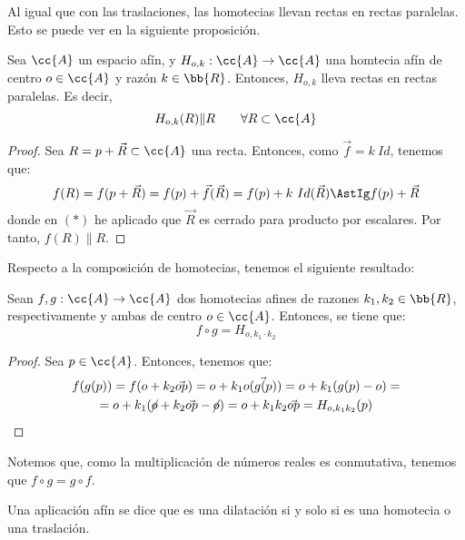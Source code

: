 Al igual que con las traslaciones, las homotecias llevan rectas en rectas paralelas. Esto se puede ver en la siguiente proposición.
\begin{prop}
    Sea $\cc{A}$ un espacio afín, y $H_{o,k}:\cc{A}\to \cc{A}$ una homtecia afín de centro $o\in \cc{A}$ y razón $k\in \bb{R}$. Entonces, $H_{o,k}$ lleva rectas en rectas paralelas. Es decir,
    \begin{equation*}
        H_{o,k}(R)\| R \qquad \forall R\subset \cc{A}
    \end{equation*}
\end{prop}
\begin{proof}
    Sea $R=p+\vec{R}\subset \cc{A}$ una recta. Entonces, como $\vec{f}=k~Id$, tenemos que:
    \begin{equation*}
        f(R) = f(p+\vec{R}) = f(p) + \vec{f}(\vec{R}) = f(p) + k~Id(\vec{R}) \AstIg f(p) + \vec{R}
    \end{equation*}
    donde en $(\ast)$ he aplicado que $\vec{R}$ es cerrado para producto por escalares. Por tanto, $f(R)\| R$.
\end{proof}

Respecto a la composición de homotecias, tenemos el siguiente resultado:
\begin{prop}
    Sean $f,g:\cc{A}\to \cc{A}$ dos homotecias afines de razones $k_1,k_2\in \bb{R}$, respectivamente y ambas de centro $o\in \cc{A}$. Entonces, se tiene que:
    \begin{equation*}
        f\circ g = H_{o,k_1\cdot k_2}
    \end{equation*}
\end{prop}
\begin{proof}
    Sea $p\in \cc{A}$. Entonces, tenemos que:
    \begin{multline*}
        f(g(p)) = f(o+k_2\vec{op}) = o+k_1\vec{o(g(p))} = o + k_1(g(p)-o) =\\= o + k_1(\cancel{o}+k_2\vec{op}-\cancel{o}) = o + k_1k_2\vec{op} = H_{o,k_1k_2}(p) \qedhere
    \end{multline*}
\end{proof}
Notemos que, como la multiplicación de números reales es conmutativa, tenemos que $f\circ g = g\circ f$.


\begin{definicion}
    Una aplicación afín se dice que es una dilatación si y solo si es una homotecia o una traslación.
\end{definicion}

